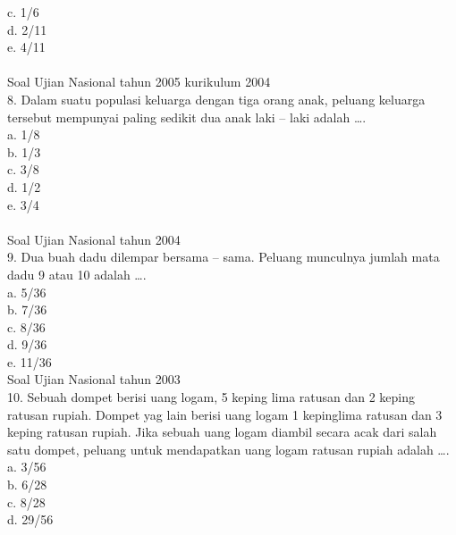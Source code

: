 \documentclass[11pt,fleqn]{book} %
\begin{document}
c. 1/6\\

d. 2/11\\

e. 4/11\\
\\

Soal Ujian Nasional tahun 2005 kurikulum 2004\\
8. Dalam suatu populasi keluarga dengan tiga orang anak, peluang keluarga tersebut mempunyai paling sedikit dua anak laki – laki adalah ….\\

a. 1/8\\

b. 1/3\\

c. 3/8\\

d. 1/2\\

e. 3/4\\
\\

Soal Ujian Nasional tahun 2004\\
9. Dua buah dadu dilempar bersama – sama. Peluang munculnya jumlah mata dadu 9 atau 10 adalah ….\\

a. 5/36\\

b. 7/36\\

c. 8/36\\

d. 9/36\\

e. 11/36\\

Soal Ujian Nasional tahun 2003\\
10. Sebuah dompet berisi uang logam, 5 keping lima ratusan dan 2 keping ratusan rupiah. Dompet yag lain berisi uang logam 1 kepinglima ratusan dan 3 keping ratusan rupiah. Jika sebuah uang logam diambil secara acak dari salah satu dompet, peluang untuk mendapatkan uang logam ratusan rupiah adalah ….\\

a. 3/56\\

b. 6/28\\

c. 8/28\\

d. 29/56\\
\end{document}
